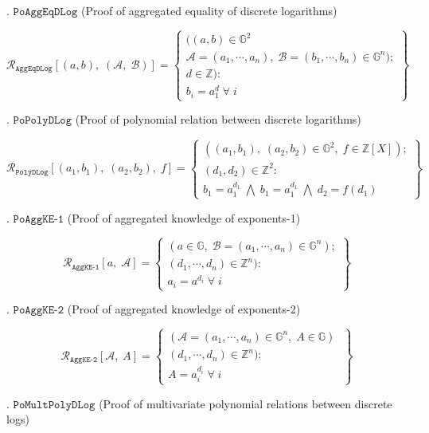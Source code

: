 \documentclass[11pt, lettersize, notitlepage, leqno, footskip=0.6cm]{article}
\newcommand{\bz}{\mathbb Z}
\newcommand{\ttt}{\texttt}
\newcommand{\mc}{\mathcal}
\newcommand{\mb}{\mathbb}
\newcommand{\noin}{\noindent}
\numberwithin{equation}{section}
\begin{document}
{\noin 2. $\ttt{PoAggEqDLog}$ (Proof of aggregated equality of discrete logarithms) \vspace{-0.3cm}

\[
  \mc{R}_{\ttt{AggEqDLog}}[(a, b),\;(\mc{A},\;\mc{B})] = \left\{\begin{array}{l}
  	((a, b)\in\mb{G}^2\\
    \mc{A} = (a_1, \cdots, a_n),\;\mc{B} = (b_1,\cdots, b_n)\in\mb{G}^n);\\
    d\in\mb{Z}): \\
    b_i = a_1^{d} \;\forall\;i
  \end{array}\right\}
\]
 

\noin 3. $\ttt{PoPolyDLog}$ (Proof of polynomial relation between discrete logarithms)\vspace{-0.3cm}

\[
  \mc{R}_{{\ttt{PolyDLog}}}[(a_1, b_1),\;(a_2,b_2),\;f] = \left\{\begin{array}{l}
    ((a_1, b_1), \; (a_2,b_2)\in\mb{G}^2,\;f\in\bz[X]);\\
    (d_1, d_2)\in\mb{Z}^2: \\
    b_1 = a_1^{d_1}\; \bigwedge\; b_1 = a_1^{d_1}\; \bigwedge \;d_2 = f(d_1)
  \end{array}\right\}
\]

\noin 4. $\ttt{PoAggKE-1}$ (Proof of aggregated knowledge of exponents-1) \vspace{-0.3cm}

\[
  \mc{R}_{{\ttt{AggKE-1}}}[a,\; \mc{A}] = \left\{\begin{array}{l}
    (a\in\mb{G},\; \mc{B} = (a_1,\cdots, a_n)\in\mb{G}^n);\\ 
    (d_1,\cdots,d_n)\in\bz^n):  \\
    a_i = a^{d_i}\;\forall\; i
  \end{array}\right\}
\]

\noin 5. $\ttt{PoAggKE-2}$ (Proof of aggregated knowledge of exponents-2) \vspace{-0.3cm}

\[
  \mc{R}_{{\ttt{AggKE-2}}}[\mc{A},\;A] = \left\{\begin{array}{l}
    (\mc{A} = (a_1,\cdots, a_n)\in \mb{G}^n,\; A\in\mb{G})\;\\ 
    (d_1,\cdots,d_n)\in\bz^n) :  \\
     A = a_i^{d_i}\;\forall\;  i
  \end{array}\right\}
\]

\noin 6. $\ttt{PoMultPolyDLog}$ (Proof of multivariate polynomial relations between discrete logs)\vspace{-0.3cm}

}
\end{document}

